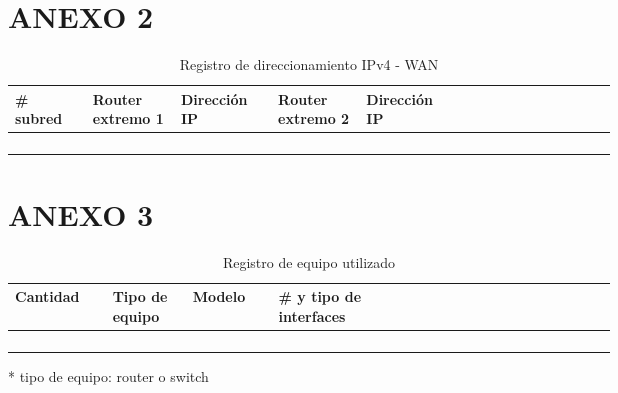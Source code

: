 \documentclass[12pt]{article}
\begin{document}
\section{ANEXO 2}
\begin{table}[ht]
\centering
\caption{Registro de direccionamiento IPv4 - WAN}
\begin{tabular}{|p{0.10\linewidth}|p{0.10\linewidth}|p{0.10\linewidth}|p{0.10\linewidth}|p{0.10\linewidth}|p{0.10\linewidth}|p{0.10\linewidth}|}
\hline
\rowcolor[HTML]{C0C0C0} 
\# subred & Router extremo 1 & Dirección IP & Router extremo 2 & Dirección IP\\ \hline
          &                  &                        &         &                     \\ \hline
          &                  &                        &         &                     \\ \hline
          &                  &                        &         &                    \\ \hline
          &                  &                        &         &                    \\ \hline
\end{tabular}
\end{table}

\section{ANEXO 3}
\begin{table}[ht]
\centering
\caption{Registro de equipo utilizado}
\begin{tabular}{|p{0.10\linewidth}|p{0.10\linewidth}|p{0.10\linewidth}|p{0.10\linewidth}|p{0.10\linewidth}|p{0.10\linewidth}|p{0.10\linewidth}|}
\hline
\rowcolor[HTML]{C0C0C0} 
Cantidad & Tipo de equipo & Modelo & \# y tipo de interfaces\\ \hline
          &                  &                        &               \\ \hline
          &                  &                        &                    \\ \hline
          &                  &                        &                   \\ \hline
          &                  &                        &                   \\ \hline
\end{tabular}
\end{table}
* tipo de equipo: router o switch
\end{document}
